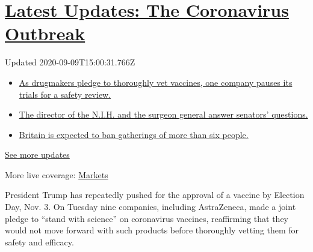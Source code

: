\hypertarget{latest-updates-the-coronavirus-outbreak}{%
\section{\texorpdfstring{\href{https://www.nytimes3xbfgragh.onion/2020/09/09/world/covid-19-coronavirus.html?action=click\&pgtype=Article\&state=default\&region=MAIN_CONTENT_1\&context=storylines_live_updates}{Latest
Updates: The Coronavirus
Outbreak}}{Latest Updates: The Coronavirus Outbreak}}\label{latest-updates-the-coronavirus-outbreak}}

Updated 2020-09-09T15:00:31.766Z

\begin{itemize}
\tightlist
\item
  \href{https://www.nytimes3xbfgragh.onion/2020/09/09/world/covid-19-coronavirus.html?action=click\&pgtype=Article\&state=default\&region=MAIN_CONTENT_1\&context=storylines_live_updates\#link-5b0bf0d1}{As
  drugmakers pledge to thoroughly vet vaccines, one company pauses its
  trials for a safety review.}
\item
  \href{https://www.nytimes3xbfgragh.onion/2020/09/09/world/covid-19-coronavirus.html?action=click\&pgtype=Article\&state=default\&region=MAIN_CONTENT_1\&context=storylines_live_updates\#link-6e2052bd}{The
  director of the N.I.H. and the surgeon general answer senators'
  questions.}
\item
  \href{https://www.nytimes3xbfgragh.onion/2020/09/09/world/covid-19-coronavirus.html?action=click\&pgtype=Article\&state=default\&region=MAIN_CONTENT_1\&context=storylines_live_updates\#link-780eaa2f}{Britain
  is expected to ban gatherings of more than six people.}
\end{itemize}

\href{https://www.nytimes3xbfgragh.onion/2020/09/09/world/covid-19-coronavirus.html?action=click\&pgtype=Article\&state=default\&region=MAIN_CONTENT_1\&context=storylines_live_updates}{See
more updates}

More live coverage:
\href{https://www.nytimes3xbfgragh.onion/live/2020/09/09/business/stock-market-today-coronavirus?action=click\&pgtype=Article\&state=default\&region=MAIN_CONTENT_1\&context=storylines_live_updates}{Markets}

President Trump has repeatedly pushed for the approval of a vaccine by
Election Day, Nov. 3. On Tuesday nine companies, including AstraZeneca,
made a joint pledge to ``stand with science'' on coronavirus vaccines,
reaffirming that they would not move forward with such products before
thoroughly vetting them for safety and efficacy.

